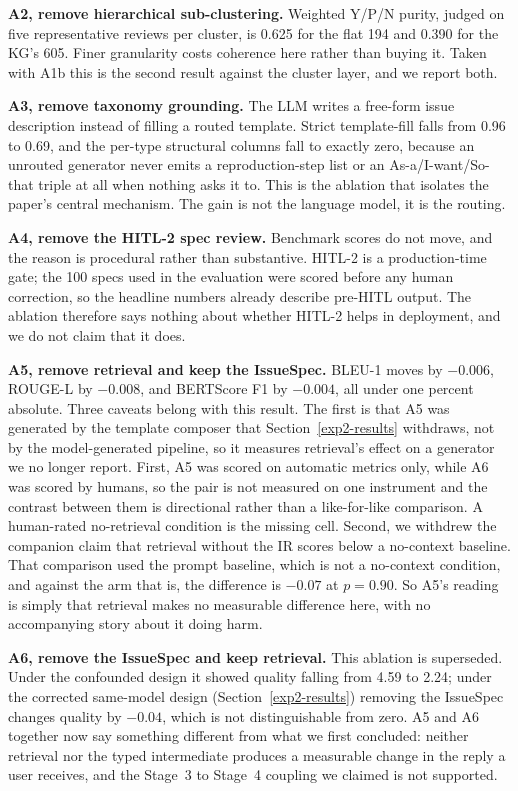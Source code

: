 \documentclass[preprint,12pt]{elsarticle}
\begin{document}
  \textbf{A2, remove hierarchical sub-clustering.} Weighted Y/P/N purity, judged on five
  representative reviews per cluster, is 0.625 for the flat 194 and 0.390 for the KG's 605. Finer
  granularity costs coherence here rather than buying it. Taken with A1b this is the second
  result against the cluster layer, and we report both.

  \textbf{A3, remove taxonomy grounding.} The LLM writes a free-form issue description instead of
  filling a routed template. Strict template-fill falls from 0.96 to 0.69, and the per-type
  structural columns fall to exactly zero, because an unrouted generator never emits a
  reproduction-step list or an As-a/I-want/So-that triple at all when nothing asks it to. This is
  the ablation that isolates the paper's central mechanism. The gain is not the language model,
  it is the routing.

  \textbf{A4, remove the HITL-2 spec review.} Benchmark scores do not move, and the reason is
  procedural rather than substantive. HITL-2 is a production-time gate; the 100 specs used in the
  evaluation were scored before any human correction, so the headline numbers already describe
  pre-HITL output. The ablation therefore says nothing about whether HITL-2 helps in deployment,
  and we do not claim that it does.

  \textbf{A5, remove retrieval and keep the IssueSpec.} BLEU-1 moves by $-0.006$, ROUGE-L by
  $-0.008$, and BERTScore F1 by $-0.004$, all under one percent absolute. Three caveats belong with
  this result. The first is that A5 was generated by the template composer that Section~\ref{exp2-results}
  withdraws, not by the model-generated pipeline, so it measures retrieval's effect on a generator
  we no longer report. First, A5 was scored on automatic metrics only, while A6 was scored by humans, so
  the pair is not measured on one instrument and the contrast between them is directional rather
  than a like-for-like comparison. A human-rated no-retrieval condition is the missing cell.
  Second, we withdrew the companion claim that retrieval without the IR scores below a
  no-context baseline. That comparison used the prompt baseline, which is not a no-context
  condition, and against the arm that is, the difference is $-0.07$ at $p = 0.90$. So A5's
  reading is simply that retrieval makes no measurable difference here, with no accompanying
  story about it doing harm.

  \textbf{A6, remove the IssueSpec and keep retrieval.} This ablation is superseded. Under the
  confounded design it showed quality falling from 4.59 to 2.24; under the corrected same-model
  design (Section~\ref{exp2-results}) removing the IssueSpec changes quality by $-0.04$, which is
  not distinguishable from zero. A5 and A6 together now say something different from what we
  first concluded: neither retrieval nor the typed intermediate produces a measurable change in
  the reply a user receives, and the Stage~3 to Stage~4 coupling we claimed is not supported.
\end{document}
